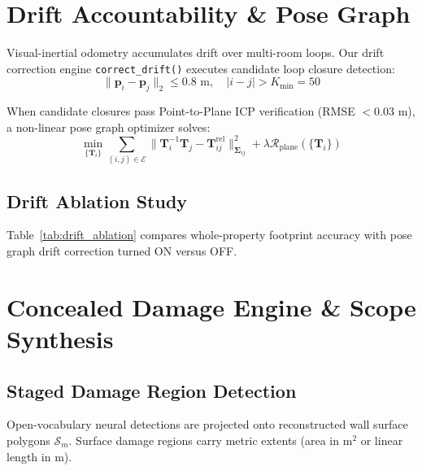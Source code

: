 \documentclass[10pt,twocolumn,a4paper]{article}
\begin{document}
\section{Drift Accountability \& Pose Graph}

Visual-inertial odometry accumulates drift over multi-room loops. Our drift correction engine \texttt{correct\_drift()} executes candidate loop closure detection:
\begin{equation}
\|\mathbf{p}_i - \mathbf{p}_j\|_2 \le 0.8\text{ m}, \quad |i - j| > K_{\text{min}} = 50
\end{equation}

When candidate closures pass Point-to-Plane ICP verification (RMSE $< 0.03\text{ m}$), a non-linear pose graph optimizer solves:
\begin{equation}
\min_{\{\mathbf{T}_i\}} \sum_{(i,j) \in \mathcal{E}} \|\mathbf{T}_i^{-1}\mathbf{T}_j - \mathbf{T}_{ij}^{\text{rel}}\|_{\boldsymbol{\Sigma}_{ij}}^2 + \lambda \mathcal{R}_{\text{plane}}(\{\mathbf{T}_i\})
\end{equation}

\subsection{Drift Ablation Study}
Table~\ref{tab:drift_ablation} compares whole-property footprint accuracy with pose graph drift correction turned ON versus OFF.

\begin{table}[h]
\centering
\caption{Drift Correction Ablation Analysis}
\label{tab:drift_ablation}
\end{table}

\section{Concealed Damage Engine \& Scope Synthesis}

\subsection{Staged Damage Region Detection}
Open-vocabulary neural detections are projected onto reconstructed wall surface polygons $\mathcal{S}_m$. Surface damage regions carry metric extents (area in $\text{m}^2$ or linear length in $\text{m}$).
\end{document}
